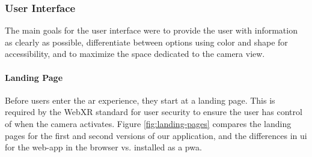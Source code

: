 \documentclass[thesis]{fputhesis}
\newcommand{\ra}[1]{\renewcommand{\arraystretch}{#1}}
\begin{document}
\begin{body}
\begin{table}[h]\centering
\caption{\acrshort{aws} Sagemaker endpoint hosting and deployment costs.}\label{tab:sagemaker}
\ra{1.2}
\end{table}
\subsubsection{User Interface}
The main goals for the user interface were to provide the user with information as clearly as possible, differentiate between options using color and shape for accessibility, and to maximize the space dedicated to the camera view. 

\paragraph{Landing Page}
Before users enter the \acrshort{ar} experience, they start at a landing page. This is required by the WebXR standard for user security to ensure the user has control of when the camera activates. Figure \ref{fig:landing-pages} compares the landing pages for the first and second versions of our application, and the differences in \acrshort{ui} for the web-app in the browser vs. installed as a \acrshort{pwa}.


\end{body}
\end{document}
